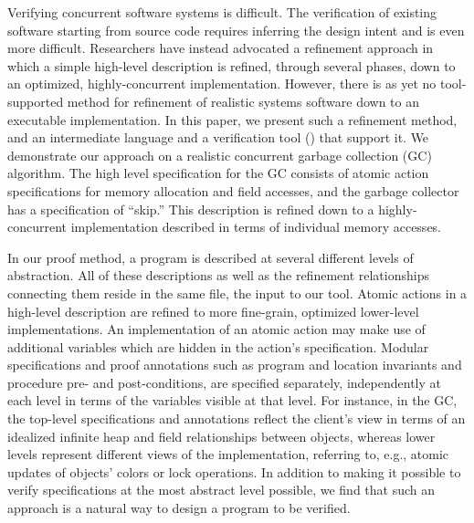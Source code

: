 Verifying concurrent software systems is difficult.
The verification of existing software starting from source code requires inferring the design intent and is even more difficult. 
Researchers have instead advocated a refinement approach in which a simple high-level description is refined, 
through several phases, down to an optimized, highly-concurrent implementation.
However, there is as yet no tool-supported method for refinement of realistic systems software down to an executable implementation.
In this paper, we present such a refinement method, and an intermediate language  and a verification tool (\civl) that support it.
We demonstrate our approach on a realistic concurrent garbage collection (GC) algorithm.
The high level specification for the GC consists of atomic action specifications for memory allocation and field accesses, 
and the garbage collector has a specification of ``skip.'' 
This description is refined down to a highly-concurrent implementation described in terms of individual memory accesses.

In our proof method, a program is described at several different levels of abstraction. 
All of these descriptions as well as the refinement relationships connecting them reside in the same \civl file, the input to our tool. 
Atomic actions in a high-level description are refined to more fine-grain, optimized lower-level implementations. 
An implementation of an atomic action may make use of additional variables which are hidden in the action's specification. 
Modular specifications and proof annotations such as program and location invariants and procedure pre- and post-conditions, 
are specified separately, independently at each level in terms of the variables visible at that level. 
For instance, in the GC, the top-level specifications and annotations reflect the client's view 
in terms of an idealized infinite heap and field relationships between objects, 
whereas lower levels represent different views of the implementation, referring to, 
e.g., atomic updates of objects' colors or lock operations.
In addition to making it possible to verify specifications at the most abstract level possible, 
we find that such an approach is a natural way to design a program to be verified.  


